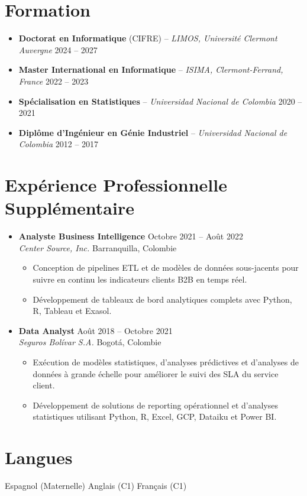 \documentclass[12pt,a4paper]{article}
\begin{document}
\section*{Formation}
\begin{itemize}
\item \textbf{Doctorat en Informatique} (CIFRE) -- \textit{LIMOS, Université Clermont Auvergne} \hfill 2024 -- 2027
\item \textbf{Master International en Informatique} -- \textit{ISIMA, Clermont-Ferrand, France} \hfill 2022 -- 2023
\item \textbf{Spécialisation en Statistiques} -- \textit{Universidad Nacional de Colombia} \hfill 2020 -- 2021
\item \textbf{Diplôme d'Ingénieur en Génie Industriel} -- \textit{Universidad Nacional de Colombia} \hfill 2012 -- 2017
\end{itemize}

\section*{Expérience Professionnelle Supplémentaire}
\begin{itemize}
\item \textbf{Analyste Business Intelligence} \hfill Octobre 2021 -- Août 2022\\
\textit{Center Source, Inc.} \hfill Barranquilla, Colombie
\begin{itemize}
\item Conception de pipelines ETL et de modèles de données sous-jacents pour suivre en continu les indicateurs clients B2B en temps réel.
\item Développement de tableaux de bord analytiques complets avec Python, R, Tableau et Exasol.
\end{itemize}

\item \textbf{Data Analyst} \hfill Août 2018 -- Octobre 2021\\
\textit{Seguros Bolívar S.A.} \hfill Bogotá, Colombie
\begin{itemize}
\item Exécution de modèles statistiques, d'analyses prédictives et d'analyses de données à grande échelle pour améliorer le suivi des SLA du service client.
\item Développement de solutions de reporting opérationnel et d'analyses statistiques utilisant Python, R, Excel, GCP, Dataiku et Power BI.
\end{itemize}
\end{itemize}

\section*{Langues}
Espagnol (Maternelle) \textbar{} Anglais (C1) \textbar{} Français (C1)
\end{document}

